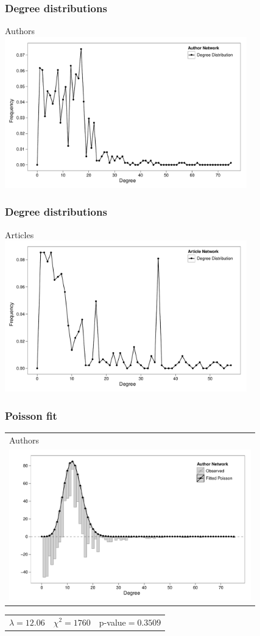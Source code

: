 \documentclass[xcolor=dvipsnames, 9pt]{beamer}
\begin{document}
\begin{frame}[fragile]
    \frametitle{Degree distributions}
    Authors \\
    \includegraphics[width=10.5cm]{../images/authors_ddplot.pdf}
\end{frame}

\begin{frame}[fragile]
    \frametitle{Degree distributions}
    Articles \\
    \includegraphics[width=10.5cm]{../images/articles_ddplot.pdf}
\end{frame}

\begin{frame}[fragile]
    \frametitle{Poisson fit}
    \begin{tabular}{l}
        Authors \\
        \includegraphics[width=10.5cm]{../images/authors_fitplot.pdf} \\
    \end{tabular}
    \begin{tabular}{ccc}
        $\lambda=12.06$ & $\chi^{2}=1760$ & p-value$=0.3509$
    \end{tabular}
\end{frame}
\end{document}
